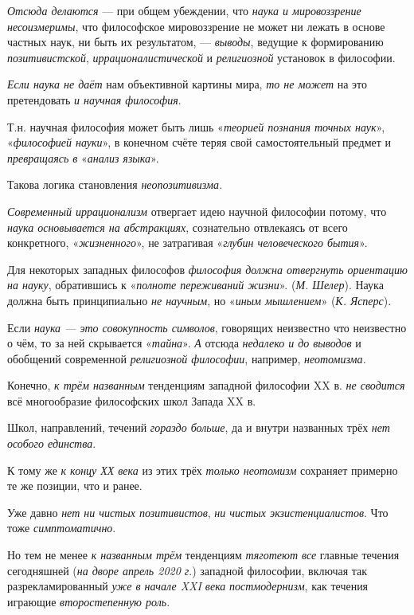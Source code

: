 \documentclass[a4paper,14pt,russian]{extreport}
\begin{document}
\emph{Отсюда делаются} --- при общем убеждении, что \emph{наука и мировоззрение несоизмеримы}, что философское мировоззрение не может ни лежать в основе частных наук, ни быть их результатом, --- \emph{выводы}, ведущие к формированию \emph{позитивистской}, \emph{иррационалистической} и \emph{религиозной} установок в философии.

\emph{Если наука не даёт} нам объективной картины мира, \emph{то не может} на это претендовать \emph{и научная философия}.

Т.н. научная философия может быть лишь «\emph{теорией познания точных наук}», «\emph{философией науки}», в конечном счёте теряя свой самостоятельный предмет и \emph{превращаясь в} «\emph{анализ языка}».

Такова логика становления \emph{неопозитивизма.}

\emph{Современный иррационализм} отвергает идею научной философии потому, что \emph{наука основывается на абстракциях}, сознательно отвлекаясь от всего конкретного, «\emph{жизненного}», не затрагивая «\emph{глубин человеческого бытия}».

Для некоторых западных философов \emph{философия должна отвергнуть ориентацию на науку}, обратившись к «\emph{полноте переживаний жизни}». (\emph{М. Шелер}). Наука должна быть принципиально \emph{не научным}, но «\emph{иным мышлением}» (\emph{К. Ясперс}).

Если \emph{наука --- это совокупность символов}, говорящих неизвестно что неизвестно о чём, то за ней скрывается «\emph{тайна}». \emph{А} отсюда \emph{недалеко и до выводов} и обобщений современной \emph{религиозной философии}, например, \emph{неотомизма.}

Конечно, \emph{к трём названным} тенденциям западной философии XX в. \emph{не сводится} всё многообразие философских школ Запада XX в.

Школ, направлений, течений \emph{гораздо больше}, да и внутри названных трёх \emph{нет особого единства}.

К тому же \emph{к концу ХХ века} из этих трёх \emph{только неотомизм} сохраняет примерно те же позиции, что и ранее.

Уже давно \emph{нет ни чистых позитивистов}, \emph{ни чистых экзистенциалистов}. Что тоже \emph{симптоматично}.

Но тем не менее \emph{к названным трём} тенденциям \emph{тяготеют все} главные течения сегодняшней (\emph{на дворе апрель 2020 г}.) западной философии, включая так разрекламированный \emph{уже в начале XXI века} \emph{постмодернизм}, как течения играющие \emph{второстепенную роль}.
\end{document}
